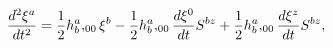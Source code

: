 \begin{equation}
\frac{d^{2}\xi ^{a}}{dt^{2}}=\frac{1}{2}h_{b}^{a},_{00}\xi ^{b}-\frac{1}{2}%
h_{b}^{a},_{00}\frac{d\xi ^{0}}{dt}S^{bz}+\frac{1}{2}h_{b}^{a},_{00}\frac{%
d\xi ^{z}}{dt}S^{bz},  \label{51}
\end{equation}

